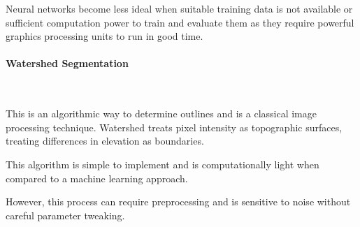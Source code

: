 \documentclass[final]{cmpreport_02}
\begin{document}
Neural networks become less ideal when suitable training data is not available or sufficient computation power to train and evaluate them as they require powerful graphics processing units to run in good time.

\paragraph{Watershed Segmentation} \

This \citep{beucher1979watersheds}  is an algorithmic way to determine outlines and is a classical image processing technique.
Watershed treats pixel intensity as topographic surfaces, treating differences in elevation as boundaries.

This algorithm is simple to implement and is computationally light when compared to a machine learning approach.

However, this process can require preprocessing and is sensitive to noise without careful parameter tweaking.
\end{document}

